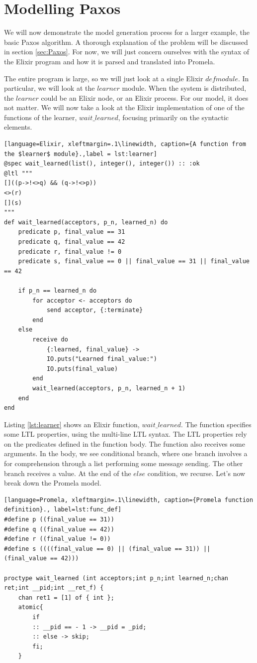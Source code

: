 \section{Modelling Paxos}
We will now demonstrate the model generation process for a larger example, the basic Paxos algorithm. A thorough explanation of the problem will be discussed in section \ref{sec:Paxos}. For now, we will just concern ourselves with the syntax of the Elixir program and how it is parsed and translated into Promela.
\par
The entire program is large, so we will just look at a single Elixir $defmodule$. In particular, we will look at the $learner$ module. When the system is distributed, the $learner$ could be an Elixir node, or an Elixir process. For our model, it does not matter. We will now take a look at the Elixir implementation of one of the functions of the learner, $wait\_learned$, focusing primarily on the syntactic elements.
\par
\begin{lstlisting}[language=Elixir, xleftmargin=.1\linewidth, caption={A function from the $learner$ module}.,label = lst:learner]
@spec wait_learned(list(), integer(), integer()) :: :ok
@ltl """
[]((p->!<>q) && (q->!<>p))
<>(r)
[](s)
"""
def wait_learned(acceptors, p_n, learned_n) do
    predicate p, final_value == 31
    predicate q, final_value == 42
    predicate r, final_value != 0
    predicate s, final_value == 0 || final_value == 31 || final_value == 42

    if p_n == learned_n do
        for acceptor <- acceptors do
            send acceptor, {:terminate}
        end
    else
        receive do
            {:learned, final_value} ->
            IO.puts("Learned final_value:")
            IO.puts(final_value)
        end
        wait_learned(acceptors, p_n, learned_n + 1)
    end
end
\end{lstlisting}
\par 
Listing \ref{lst:learner} shows an Elixir function, $wait\_learned$. The function specifies some LTL properties, using the multi-line LTL syntax. The LTL properties rely on the predicates defined in the function body. The function also receives some arguments. In the body, we see conditional branch, where one branch involves a for comprehension through a list performing some message sending. The other branch receives a value. At the end of the $else$ condition, we recurse. Let's now break down the Promela model.
\par
\begin{lstlisting}[language=Promela, xleftmargin=.1\linewidth, caption={Promela function definition}., label=lst:func_def]
#define p ((final_value == 31))
#define q ((final_value == 42))
#define r ((final_value != 0))
#define s ((((final_value == 0) || (final_value == 31)) || (final_value == 42)))

proctype wait_learned (int acceptors;int p_n;int learned_n;chan ret;int __pid;int __ret_f) {
    chan ret1 = [1] of { int }; 
    atomic{
        if
        :: __pid == - 1 -> __pid = _pid;
        :: else -> skip;
        fi;
    }
\end{lstlisting}
